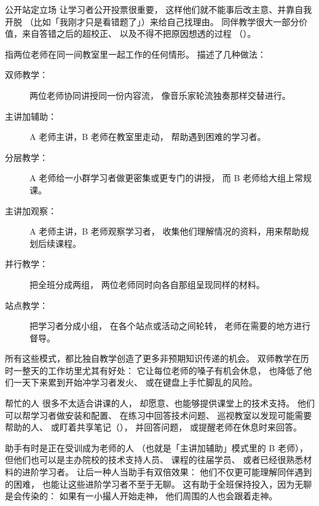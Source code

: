 \newpage
\begin{aside}{公开站定立场}
  让学习者公开投票很重要，
  这样他们就不能事后改主意、并靠自我开脱
  （比如「我刚才只是看错题了」）来给自己找理由。
  同伴教学很大一部分价值，来自答错之后的超校正、
  以及不得不把原因想透的过程
  （）。
\end{aside}


指两位老师在同一间教室里一起工作的任何情形。
\cite{Frie2016}描述了几种做法：

\begin{description}

\item[双师教学：]
  两位老师协同讲授同一份内容流，
  像音乐家轮流独奏那样交替进行。

\item[主讲加辅助：]
  A 老师主讲，B 老师在教室里走动，
  帮助遇到困难的学习者。

\item[分层教学：]
  A 老师给一小群学习者做更密集或更专门的讲授，
  而 B 老师给大组上常规课。

\item[主讲加观察：]
  A 老师主讲，B 老师观察学习者，
  收集他们理解情况的资料，用来帮助规划后续课程。

\item[并行教学：]
  把全班分成两组，
  两位老师同时向各自那组呈现同样的材料。

\item[站点教学：]
  把学习者分成小组，
  在各个站点或活动之间轮转，
  老师在需要的地方进行督导。

\end{description}

所有这些模式，都比独自教学创造了更多非预期知识传递的机会。
双师教学在历时一整天的工作坊里尤其有好处：
它让每位老师的嗓子有机会休息，
也降低了他们一天下来累到开始冲学习者发火、
或在键盘上手忙脚乱的风险。

\begin{aside}{帮忙的人}
  很多不太适合讲课的人，
  却愿意、也能够提供课堂上的技术支持。
  他们可以帮学习者做安装和配置、
  在练习中回答技术问题、
  巡视教室以发现可能需要帮助的人、
  或盯着共享笔记（），
  并回答问题，
  或提醒老师在休息时来回答。

  助手有时是正在受训成为老师的人
  （也就是「主讲加辅助」模式里的 B 老师），
  但他们也可以是主办院校的技术支持人员、
  课程的往届学员、
  或者已经很熟悉材料的进阶学习者。
  让后一种人当助手有双倍效果：
  他们不仅更可能理解同伴遇到的困难，
  也能让这些进阶学习者不至于无聊。
  这有助于全班保持投入，因为无聊是会传染的：
  如果有一小撮人开始走神，
  他们周围的人也会跟着走神。
\end{aside}

